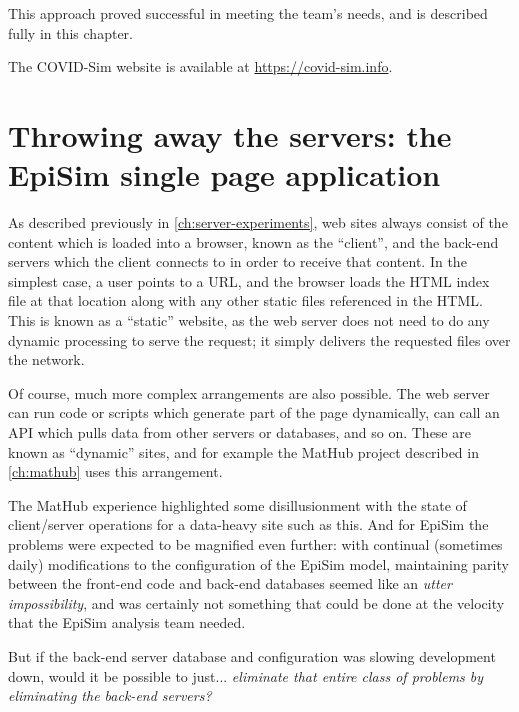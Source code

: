 This approach proved successful in meeting the team's needs, and is described fully in this chapter.

The COVID-Sim website is available at \url{https://covid-sim.info}.

\hypertarget{covid-throw-away-the-servers}{%
\section{Throwing away the servers: the EpiSim single page application}\label{covid-throw-away-the-servers}}

As described previously in \autoref{ch:server-experiments}, web sites always consist of the content which is loaded into a browser, known as the ``client'', and the back-end servers which the client connects to in order to receive that content. In the simplest case, a user points to a URL, and the browser loads the HTML index file at that location along with any other static files referenced in the HTML. This is known as a ``static'' website, as the web server does not need to do any dynamic processing to serve the request; it simply delivers the requested files over the network.

Of course, much more complex arrangements are also possible. The web server can run code or scripts which generate part of the page dynamically, can call an \gls{API} which pulls data from other servers or databases, and so on. These are known as ``dynamic'' sites, and for example the MatHub project described in \autoref{ch:mathub} uses this arrangement.

The MatHub experience highlighted some disillusionment with the state of client/server operations for a data-heavy site such as this. And for EpiSim the problems were expected to be magnified even further: with continual (sometimes daily) modifications to the configuration of the EpiSim model, maintaining parity between the front-end code and back-end databases seemed like an \emph{utter impossibility}, and was certainly not something that could be done at the velocity that the EpiSim analysis team needed.

But if the back-end server database and configuration was slowing development down, would it be possible to just... \emph{eliminate that entire class of problems by eliminating the back-end servers?}

